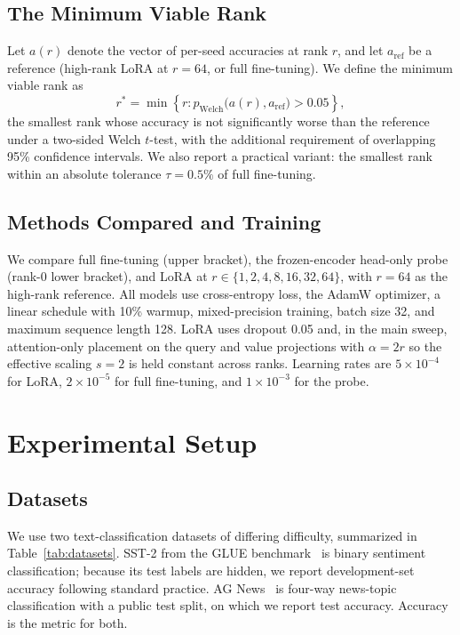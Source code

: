 \documentclass[conference]{IEEEtran}
\begin{document}
\subsection{The Minimum Viable Rank}
Let $a(r)$ denote the vector of per-seed accuracies at rank $r$, and let $a_{\mathrm{ref}}$ be a reference (high-rank LoRA at $r{=}64$, or full fine-tuning). We define the minimum viable rank as
\begin{equation}
r^\ast = \min \left\{ r : p_{\mathrm{Welch}}\big(a(r), a_{\mathrm{ref}}\big) > 0.05 \right\},
\label{eq:mvr}
\end{equation}
the smallest rank whose accuracy is not significantly worse than the reference under a two-sided Welch $t$-test, with the additional requirement of overlapping 95\% confidence intervals. We also report a practical variant: the smallest rank within an absolute tolerance $\tau = 0.5\%$ of full fine-tuning.

\subsection{Methods Compared and Training}
We compare full fine-tuning (upper bracket), the frozen-encoder head-only probe (rank-0 lower bracket), and LoRA at $r \in \{1,2,4,8,16,32,64\}$, with $r{=}64$ as the high-rank reference. All models use cross-entropy loss, the AdamW optimizer, a linear schedule with 10\% warmup, mixed-precision training, batch size 32, and maximum sequence length 128. LoRA uses dropout 0.05 and, in the main sweep, attention-only placement on the query and value projections with $\alpha = 2r$ so the effective scaling $s = 2$ is held constant across ranks. Learning rates are $5\times10^{-4}$ for LoRA, $2\times10^{-5}$ for full fine-tuning, and $1\times10^{-3}$ for the probe.

\section{Experimental Setup}
\label{sec:setup}

\subsection{Datasets}
We use two text-classification datasets of differing difficulty, summarized in Table~\ref{tab:datasets}. SST-2 from the GLUE benchmark~\cite{wang2018glue,socher2013sst} is binary sentiment classification; because its test labels are hidden, we report development-set accuracy following standard practice. AG News~\cite{zhang2015agnews} is four-way news-topic classification with a public test split, on which we report test accuracy. Accuracy is the metric for both.
\end{document}
